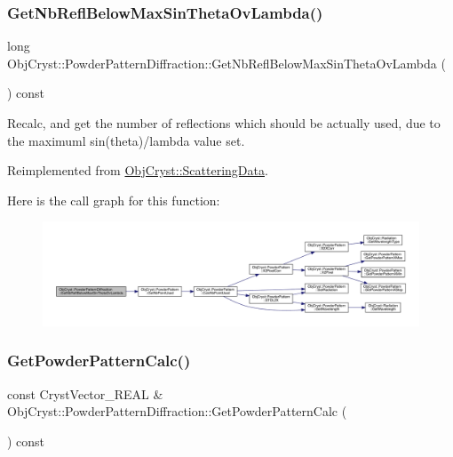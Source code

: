 \subsubsection{\texorpdfstring{GetNbReflBelowMaxSinThetaOvLambda()}{GetNbReflBelowMaxSinThetaOvLambda()}}
{\footnotesize\ttfamily long Obj\+Cryst\+::\+Powder\+Pattern\+Diffraction\+::\+Get\+Nb\+Refl\+Below\+Max\+Sin\+Theta\+Ov\+Lambda (\begin{DoxyParamCaption}{ }\end{DoxyParamCaption}) const\hspace{0.3cm}{\ttfamily [virtual]}}

Recalc, and get the number of reflections which should be actually used, due to the maximuml sin(theta)/lambda value set. 

Reimplemented from \mbox{\hyperlink{class_obj_cryst_1_1_scattering_data_aeceded13328adf88e001b08ce1abed7f}{Obj\+Cryst\+::\+Scattering\+Data}}.

Here is the call graph for this function\+:
\nopagebreak
\begin{figure}[H]
\begin{center}
\leavevmode
\includegraphics[width=350pt]{class_obj_cryst_1_1_powder_pattern_diffraction_a87785bf69fbd81df78c47f3d42efaf4e_cgraph}
\end{center}
\end{figure}
\mbox{\label{class_obj_cryst_1_1_powder_pattern_diffraction_a29b64d9d3d36eff816bd6dd2ce61a3c7}} 
\subsubsection{\texorpdfstring{GetPowderPatternCalc()}{GetPowderPatternCalc()}}
{\footnotesize\ttfamily const Cryst\+Vector\+\_\+\+R\+E\+AL \& Obj\+Cryst\+::\+Powder\+Pattern\+Diffraction\+::\+Get\+Powder\+Pattern\+Calc (\begin{DoxyParamCaption}{ }\end{DoxyParamCaption}) const\hspace{0.3cm}{\ttfamily [virtual]}}

